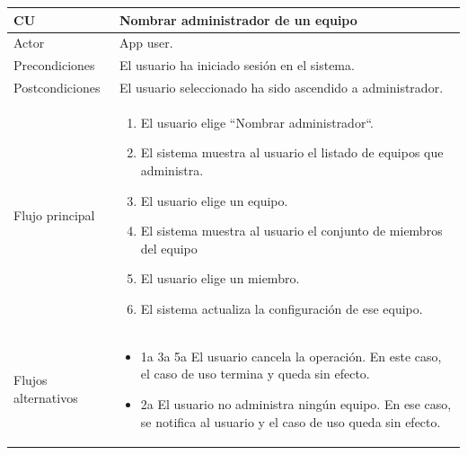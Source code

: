 \documentclass[twoside]{report}
\newcommand\addrow[2]{#1 &#2\\ }
\newcommand\addheading[2]{#1 &#2\\ \hline}
\newcommand\tabularhead{\begin{tabular}{lp{0.7\textwidth}}
\hline
}
\newenvironment{usecase}{\tabularhead}
{\hline\end{tabular}}
\begin{document}
\begin{usecase}
  \addheading{\textbf{CU\arabic{usecase}}}{Nombrar administrador de un equipo} 
  \addrow{Actor}{App user.}
  \addrow{Precondiciones}{El usuario ha iniciado sesión en el sistema.}
  \addrow{Postcondiciones}{El usuario seleccionado ha sido ascendido a administrador.}
  \addrow{Flujo principal}{
  		\begin{enumerate}
  		\item El usuario elige “Nombrar administrador“. %
  		\item El sistema muestra al usuario el listado de equipos que administra. %
  		\item El usuario elige un equipo. %
  		\item El sistema muestra al usuario el conjunto de miembros del equipo %
  		\item El usuario elige un miembro. %
  		\item El sistema actualiza la configuración de ese equipo. %
  		\end{enumerate}
  }
  \addrow{Flujos alternativos}{
  		\begin{itemize}
  		\item 1a 3a 5a El usuario cancela la operación. En este caso, el caso de uso termina y queda sin efecto.
  		\item 2a El usuario no administra ningún equipo. En ese caso, se notifica al usuario y el caso de uso queda sin efecto.
  		\end{itemize}
  }
\end{usecase}\\

\vspace{0.5cm}
\end{document}
